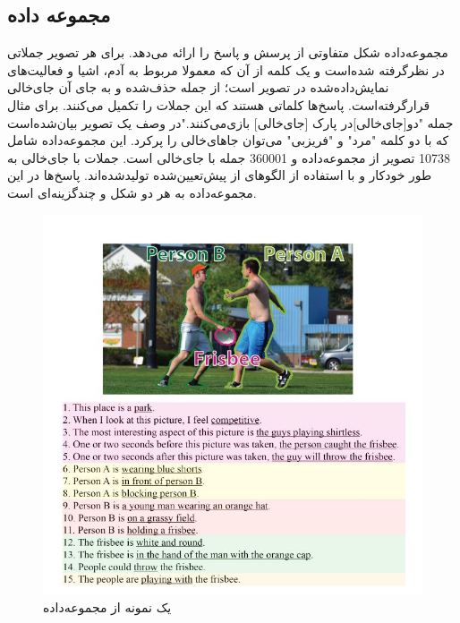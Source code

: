 \subsection{مجموعه داده  \cite{yu2015visual}}

	مجموعه‌داده 
	شکل متفاوتی از پرسش و پاسخ را ارائه می‌دهد. برای هر تصویر جملاتی در نظرگرفته شده‌است و یک کلمه از آن که معمولا مربوط به آدم، اشیا و  فعالیت‌های نمایش‌داده‌شده در تصویر است؛ از جمله حذف‌شده و به جای آن جای‌خالی قرار‌گرفته‌است. پاسخ‌ها کلماتی هستند که این جملات را تکمیل می‌کنند. برای مثال جمله "دو[جای‌خالی]در پارک [جای‌خالی] بازی‌می‌کنند."در وصف یک تصویر بیان‌شده‌است که با دو کلمه "مرد" و "فریزبی" می‌توان جاهای‌خالی‌ را پرکرد. این مجموعه‌داده شامل 10738 تصویر از مجموعه‌داده 
	\cite{lin2014microsoft}
	 و 360001 جمله با جای‌خالی است. جملات با جای‌خالی به طور خودکار و با استفاده از الگوهای از پیش‌تعیین‌شده تولیدشده‌اند. پاسخ‌ها در این مجموعه‌داده به هر دو شکل 
	و چند‌گزینه‌ای است.
  \begin{figure}[h]
	\centerline{\includegraphics[scale=0.5]{images/visualmadlibs.JPG}}
	\caption{یک نمونه از مجموعه‌داده  \cite{yu2015visual}}
	\label{fig:visualmadlibsExample}
  \end{figure}

